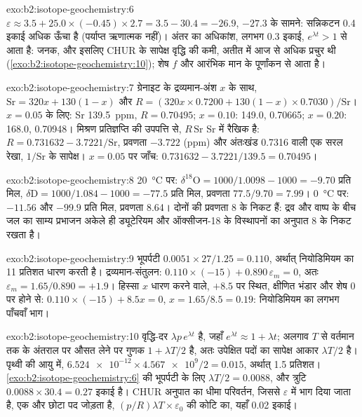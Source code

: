 \begin{solution}{exo:b2:isotope-geochemistry:6}
$\varepsilon \approx 3.5 + 25.0\times(-0.45)\times2.7 = 3.5 - 30.4 = -26.9$,
$-27.3$ के सामने: सन्निकटन 0.4 इकाई अधिक ऊँचा है (पर्याप्त ऋणात्मक नहीं)। अंतर का
अधिकांश, लगभग 0.3 इकाई, $e^{\lambda t} > 1$ से आता है: जनक, और इसलिए
CHUR के सापेक्ष वृद्धि की कमी, अतीत में आज से अधिक प्रचुर थी
(\cref{exo:b2:isotope-geochemistry:10}); शेष $f$ और आरंभिक मान के पूर्णांकन से आता है।
\end{solution}

\begin{solution}{exo:b2:isotope-geochemistry:7}
ग्रेनाइट के द्रव्यमान-अंश $x$ के साथ, $\mathrm{Sr} = 320x + 130(1-x)$ और
$R = (320x\times0.7200 + 130(1-x)\times0.7030)/\mathrm{Sr}$। $x = 0.05$ के लिए: Sr
\qty{139.5}{ppm}, $R = 0.70495$; $x = 0.10$: 149.0, 0.70665; $x = 0.20$: 168.0,
0.70948। मिश्रण प्रतिज्ञप्ति की उपपत्ति से, $R\,\mathrm{Sr}$ Sr में रैखिक है:
$R = 0.731632 - 3.7221/\mathrm{Sr}$, प्रवणता $-3.722$ (ppm) और अंतःखंड 0.7316 वाली
एक सरल रेखा, $1/\mathrm{Sr}$ के सापेक्ष। $x = 0.05$ पर जाँच: $0.731632 - 3.7221/139.5
= 0.70495$।
\end{solution}

\begin{solution}{exo:b2:isotope-geochemistry:8}
\qty{20}{\degreeCelsius} पर: $\delta^{18}\mathrm{O} = 1000/1.0098 - 1000 = -9.70$ प्रति
मिल, $\delta\mathrm{D} = 1000/1.084 - 1000 = -77.5$ प्रति मिल, प्रवणता $77.5/9.70 = 7.99$।
\qty{0}{\degreeCelsius} पर: $-11.56$ और $-99.9$ प्रति मिल, प्रवणता 8.64। दोनों  की प्रवणता 8 के निकट हैं: द्रव और वाष्प के बीच जल का साम्य प्रभाजन
अकेले ही ड्यूटेरियम और ऑक्सीजन-18 के विस्थापनों का अनुपात
8 के निकट रखता है।
\end{solution}

\begin{solution}{exo:b2:isotope-geochemistry:9}
भूपर्पटी $0.0051\times27/1.25 = 0.110$, अर्थात् नियोडिमियम का 11 प्रतिशत धारण करती है।
द्रव्यमान-संतुलन: $0.110\times(-15) + 0.890\,\varepsilon_m = 0$, अतः $\varepsilon_m = 1.65/0.890 =
+1.9$। हिस्सा $x$ धारण करने वाले, $+8.5$ पर स्थित, क्षीणित भंडार और शेष 0 पर होने से:
$0.110\times(-15) + 8.5x = 0$, $x = 1.65/8.5 = 0.19$: नियोडिमियम का लगभग
पाँचवाँ भाग।
\end{solution}

\begin{solution}{exo:b2:isotope-geochemistry:10}
वृद्धि-दर $\lambda p\,e^{\lambda t}$ है, जहाँ $e^{\lambda t} \approx 1 + \lambda t$;
अलगाव $T$ से वर्तमान तक के अंतराल पर औसत लेने पर गुणक
$1 + \lambda T/2$ है, अतः उपेक्षित पदों का सापेक्ष आकार $\lambda T/2$ है। पृथ्वी की
आयु में, $\num{6.524e-12}\times\num{4.567e9}/2 = 0.015$, अर्थात् 1.5 प्रतिशत।
\cref{exo:b2:isotope-geochemistry:6} की भूपर्पटी के लिए $\lambda T/2 = 0.0088$, और त्रुटि $0.0088\times30.4 = 0.27$
इकाई है। CHUR अनुपात का धीमा परिवर्तन, जिससे $\varepsilon$ में भाग दिया जाता है,
एक और छोटा पद जोड़ता है, $(p/R)\lambda T \times \varepsilon_0$ की कोटि का, यहाँ 0.02 इकाई।
\end{solution}

